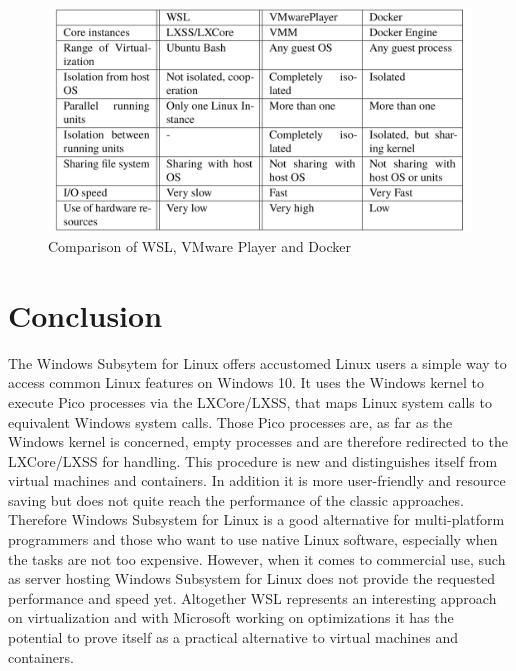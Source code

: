\documentclass[utf8,biblatex, ngerman, english]{lni}
\begin{document}
\clearpage

\begin{figure}
 \hspace{-3.8mm}
  \includegraphics[width=1.048\textwidth]{Tabelle.PNG}
  \caption{Comparison of WSL, VMware Player and Docker}
  \label{tab:demo} 
\end{figure}

\section{Conclusion} 
The Windows Subsytem for Linux offers accustomed Linux users a simple way to access common Linux features on Windows 10.
It uses the Windows kernel to execute Pico processes via the LXCore/LXSS, that maps Linux system calls to equivalent Windows system calls. Those Pico processes are, as far as the Windows kernel is concerned, empty processes and are therefore redirected to the LXCore/LXSS for handling. This procedure is new and distinguishes itself from virtual machines and containers. In addition it is more user-friendly and resource saving but does not quite reach the performance of the classic approaches. Therefore Windows Subsystem for Linux is a good alternative for multi-platform programmers and those who want to use native Linux software, especially when the tasks are not too expensive. However, when it comes to commercial use, such as server hosting Windows Subsystem for Linux does not provide the requested performance and speed yet. Altogether WSL represents an interesting approach on virtualization and with Microsoft working on optimizations it has the potential to prove 
itself as a practical alternative to virtual machines and containers. 

\newpage
{}
\printbibliography
\end{document}
